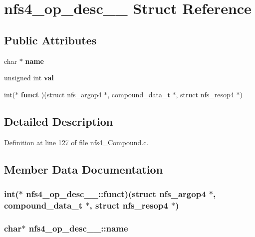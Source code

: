 \section{nfs4\_\-op\_\-desc\_\-\_\- Struct Reference}
\label{structnfs4__op__desc____}
\subsection*{Public Attributes}
\begin{CompactItemize}
\item 
char $\ast$ {\bf name}
\item 
unsigned int {\bf val}
\item 
int($\ast$ {\bf funct} )(struct nfs\_\-argop4 $\ast$, compound\_\-data\_\-t $\ast$, struct nfs\_\-resop4 $\ast$)
\end{CompactItemize}


\subsection{Detailed Description}


Definition at line 127 of file nfs4\_\-Compound.c.

\subsection{Member Data Documentation}
\subsubsection[{funct}]{\setlength{\rightskip}{0pt plus 5cm}int($\ast$ {\bf nfs4\_\-op\_\-desc\_\-\_\-::funct})(struct nfs\_\-argop4 $\ast$, compound\_\-data\_\-t $\ast$, struct nfs\_\-resop4 $\ast$)}\label{structnfs4__op__desc_____84c066ada70589fed546c3b1c90fc781}


\subsubsection[{name}]{\setlength{\rightskip}{0pt plus 5cm}char$\ast$ {\bf nfs4\_\-op\_\-desc\_\-\_\-::name}}\label{structnfs4__op__desc_____930e0a0f589ae041cf1a6e74e0bcfdbb}




